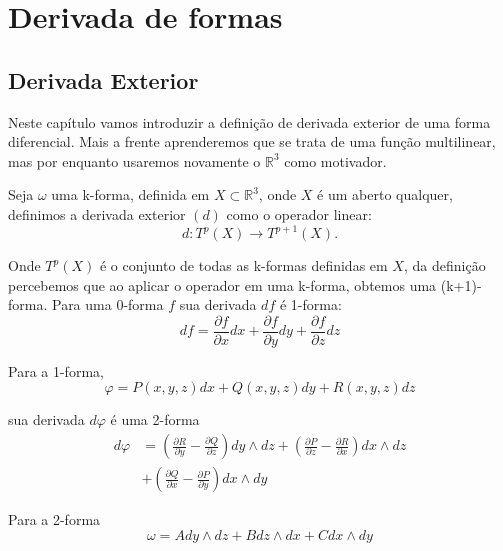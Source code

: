 \section{Derivada de formas}



\subsection{Derivada Exterior}

\hspace{0.5cm}
Neste capítulo vamos introduzir a definição de derivada exterior 
de uma forma diferencial. Mais a frente aprenderemos que se trata 
de uma função multilinear, mas por enquanto usaremos novamente o 
$\mathbb{R}^3$ como motivador. 

Seja $\omega$ uma k-forma, definida em $X \subset \mathbb{R}^3$, 
onde $X$ é um aberto qualquer, definimos a derivada exterior $(d)$ 
como o operador linear:
%
\begin{equation}
d:T^{p}(X) \to T^{p+1}(X).
\end{equation}

\hspace{0.5cm}
Onde $T^{p}(X)$ é o conjunto de todas as k-formas definidas em $X$, da definição percebemos que ao aplicar o operador em uma k-forma, 
obtemos uma (k+1)-forma. Para uma 0-forma $f$ sua derivada $df$ é 1-forma:
%
\begin{equation}
df = \frac{\partial f}{\partial x}dx + \frac{\partial f}{\partial y}dy + \frac{\partial f}{\partial z}dz
\end{equation}

Para a 1-forma,
%
\begin{equation}
\varphi = P(x,y,z)dx + Q(x,y,z)dy + R(x,y,z)dz    
\end{equation}

sua derivada $d\varphi$ é uma 2-forma
%
\begin{align}
\nonumber d\varphi &= \left(\frac{\partial R}{\partial y} 
- \frac{\partial Q}{\partial z}\right) dy \wedge dz 
+ \left(\frac{\partial P}{\partial z} 
- \frac{\partial R}{\partial x}\right) dx \wedge dz
\\
&+ \left(\frac{\partial Q}{\partial x} 
- \frac{\partial P}{\partial y}\right) dx \wedge dy
\end{align}

Para a 2-forma
%
\begin{equation}
\omega = A dy \wedge dz + B dz \wedge dx + C dx \wedge dy    
\end{equation}

